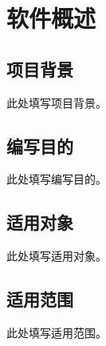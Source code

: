 \section{软件概述}

\subsection{项目背景}
此处填写项目背景。

\subsection{编写目的}
此处填写编写目的。

\subsection{适用对象}
此处填写适用对象。

\subsection{适用范围}
此处填写适用范围。




